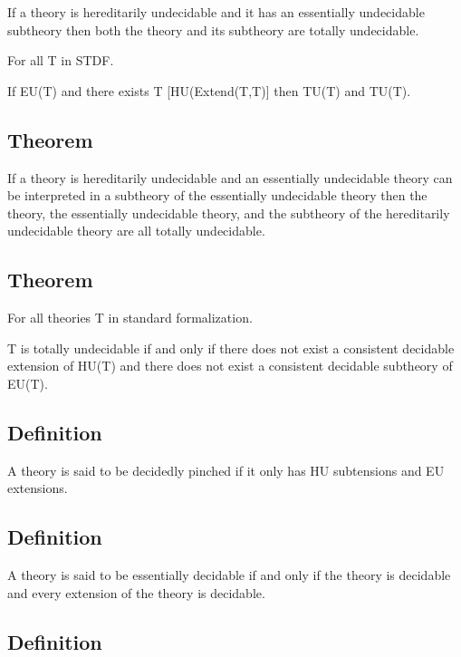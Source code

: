 If a theory is hereditarily undecidable and it has an essentially
undecidable subtheory then both the theory and its subtheory are totally
undecidable.

For all T in STDF.

If EU(T) and there exists T\textquotesingle{}
{[}HU(Extend(T,T\textquotesingle){]} then TU(T) and
TU(T\textquotesingle).

\hypertarget{theorem-3}{%
\subsection{Theorem}\label{theorem-3}}

If a theory is hereditarily undecidable and an essentially undecidable
theory can be interpreted in a subtheory of the essentially undecidable
theory then the theory, the essentially undecidable theory, and the
subtheory of the hereditarily undecidable theory are all totally
undecidable.

\hypertarget{theorem-4}{%
\subsection{Theorem}\label{theorem-4}}

For all theories T in standard formalization.

T is totally undecidable if and only if there does not exist a
consistent decidable extension of HU(T) and there does not exist a
consistent decidable subtheory of EU(T).

\hypertarget{definition-1}{%
\subsection{Definition}\label{definition-1}}

A theory is said to be decidedly pinched if it only has HU subtensions
and EU extensions.

\hypertarget{definition-2}{%
\subsection{Definition}\label{definition-2}}

A theory is said to be essentially decidable if and only if the theory
is decidable and every extension of the theory is decidable.

\hypertarget{definition-3}{%
\subsection{Definition}\label{definition-3}}

